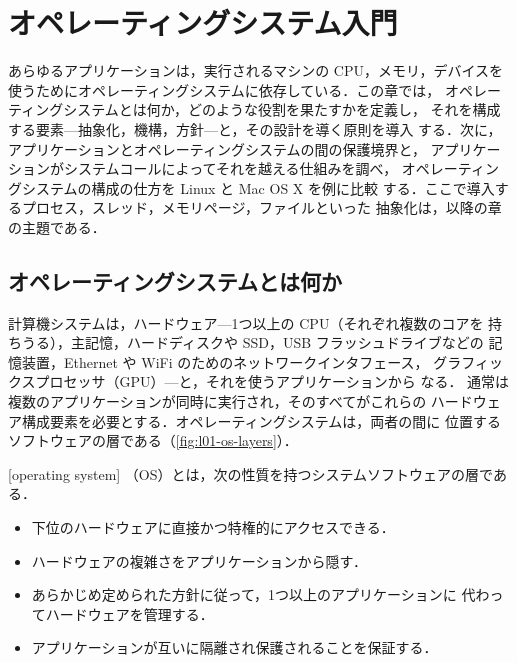 \documentclass[../main.tex]{subfiles}
\begin{document}
\chapter{オペレーティングシステム入門}

あらゆるアプリケーションは，実行されるマシンの CPU，メモリ，デバイスを
使うためにオペレーティングシステムに依存している．この章では，
オペレーティングシステムとは何か，どのような役割を果たすかを定義し，
それを構成する要素---抽象化，機構，方針---と，その設計を導く原則を導入
する．次に，アプリケーションとオペレーティングシステムの間の保護境界と，
アプリケーションがシステムコールによってそれを越える仕組みを調べ，
オペレーティングシステムの構成の仕方を Linux と Mac OS X を例に比較
する．ここで導入するプロセス，スレッド，メモリページ，ファイルといった
抽象化は，以降の章の主題である．

\section{オペレーティングシステムとは何か}
\label{sec:l01-what}

計算機システムは，ハードウェア---1つ以上の CPU（それぞれ複数のコアを
持ちうる），主記憶，ハードディスクや SSD，USB フラッシュドライブなどの
記憶装置，Ethernet や WiFi のためのネットワークインタフェース，
グラフィックスプロセッサ（GPU）---と，それを使うアプリケーションから
なる．%
通常は複数のアプリケーションが同時に実行され，そのすべてがこれらの
ハードウェア構成要素を必要とする．オペレーティングシステムは，両者の間に
位置するソフトウェアの層である（\cref{fig:l01-os-layers}）．

\begin{definition}[オペレーティングシステム]
  [operating system]%
  （OS）とは，次の性質を持つシステムソフトウェアの層である．
  \begin{itemize}
    \item 下位のハードウェアに直接かつ特権的にアクセスできる．
    \item ハードウェアの複雑さをアプリケーションから隠す．
    \item あらかじめ定められた方針に従って，1つ以上のアプリケーションに
      代わってハードウェアを管理する．
    \item アプリケーションが互いに隔離され保護されることを保証する．
  \end{itemize}
\end{definition}
\end{document}
